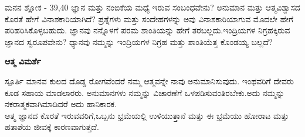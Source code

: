 \newpage
\begin{mananam}{\mananamfont ಮನನ ಶ್ಲೋಕ - \textenglish{39,40}}
\footnotesize \mananamtext ಜ್ಞಾನ ಮತ್ತು ನಂಬಿಕೆಯ ಮಧ್ಯೆ ಇರುವ ಸಂಬಂಧವೇನು? ಅನುಮಾನ ಮತ್ತು ಆತ್ಮವಿಶ್ವಾಸದ ಕೊರತೆ ಹೇಗೆ ವಿನಾಶಕಾರಿಯಾಗಿದೆ? ಪ್ರಶ್ನೆಗಳು ಮತ್ತು ಸಂದೇಹಗಳನ್ನು  ಅವು ವಿನಾಶಕಾರಿಯಾಗುವ ಮೊದಲೇ ಹೇಗೆ ಪರಿಹರಿಸಿಕೊಳ್ಳಬಹುದು. ಜ್ಞಾನವು ನನ್ನೊಳಗೆ ಪರಮ ಶಾಂತಿಯನ್ನು ಹೇಗೆ ತರಬಲ್ಲದು.ಇಂದ್ರಿಯಗಳ ನಿಗ್ರಹಕ್ಕಿರುವ ಜ್ಞಾನದ ಸ್ವರೂಪವೇನು? ಧ್ಯಾನವು ನಮ್ಮನ್ನು  ಇಂದ್ರಿಯಗಳ ನಿಗ್ರಹ ಮತ್ತು ಶಾಂತಿಯೆತ್ತ ಕೊಂಡಯ್ಯ ಬಲ್ಲದೆ?\\
\end{mananam}
\WritingHand\enspace\textbf{ಆತ್ಮ ವಿಮರ್ಶೆ}\\
\begin{inspiration}{\mananamfont ಸ್ಪೂರ್ತಿ}
\footnotesize \mananamtext ಮಾನವ ಕುಲದ ದೊಡ್ಡ ರೋಗವೆಂದರೆ ನಮ್ಮ ಆತ್ಮವನ್ನೇ ನಾವು ಅನುಮಾನಿಸುವುದು. ಇಂಥವರಿಗೆ ದೇವರು ಕೂಡ ಸಹಾಯ ಮಾಡಲಾರರು. ಅನುಮಾನಗಳು ನಮ್ಮನ್ನು ವಿಚಾರಣೆಗೆ ಒಳಪಡಿಸುವಂತಿರಬೇಕು.ಅದು ನಮ್ಮನ್ನು ನಕರಾತ್ಮಕವಾಗಿಮಾಡಿದರೆ ಅದು ಹಾನಿಕಾರಕ.\\
 ಆತ್ಮ ಜ್ಞಾನದ ಕೊರತೆ ಇರುವವರಿಗೆ,ಒಬ್ಬನು ಭ್ರಮೆಯಲ್ಲಿ ಉಳಿಯುತ್ತಾನೆ ಮತ್ತು ಈ ಭ್ರಮೆಯು ಹೋರಾಟ ಮತ್ತು ಹತಾಶೆಯ ಜೀವಕ್ಕೆ ಕಾರಣವಾಗುತ್ತದೆ. 
\end{inspiration}
\newpage


